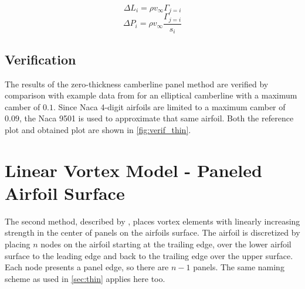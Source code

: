 \begin{equation}
\label{eq:thin_lift}
\Delta L_i = \rho v_\infty \Gamma_{j=i}
\end{equation}
\begin{equation}
\label{eq:thin_press}
\Delta P_i = \rho v_\infty \frac{\Gamma_{j=i}}{s_i}
\end{equation}

\subsection{Verification}
The results of the zero-thickness camberline panel method are verified by
comparison with example data from \citeauthor{katz_plotkin} for an elliptical
camberline with a maximum camber of $0.1$. Since Naca 4-digit airfoils are
limited to a maximum camber of $0.09$, the Naca 9501 is used to approximate that
same airfoil. Both the reference plot and obtained plot are shown in \autoref{fig:verif_thin}.


\section{Linear Vortex Model - Paneled Airfoil Surface}
\label{sec:thick}
The second method, described by %
\citeauthor{kuethe_chow_1998}\cite{kuethe_chow_1998}, places vortex elements
with linearly increasing strength in the center of panels on the airfoils
surface. The airfoil is discretized by placing $n$ nodes on the airfoil starting
at the trailing edge, over the lower airfoil surface to the leading edge and
back to the trailing edge over the upper surface. Each node presents a panel
edge, so there are $n-1$ panels. The same naming scheme as used in
\autoref{sec:thin} applies here too.

